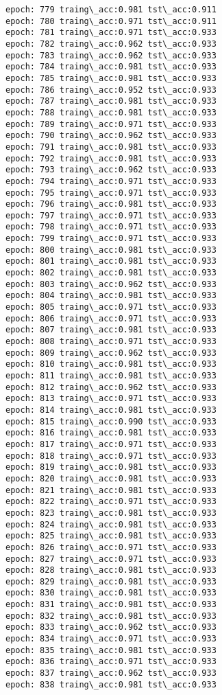\documentclass[11pt]{article}
\begin{document}
\begin{Verbatim}[commandchars=\\\{\}]
epoch: 779 traing\_acc:0.981 tst\_acc:0.911
epoch: 780 traing\_acc:0.971 tst\_acc:0.911
epoch: 781 traing\_acc:0.971 tst\_acc:0.933
epoch: 782 traing\_acc:0.962 tst\_acc:0.933
epoch: 783 traing\_acc:0.962 tst\_acc:0.933
epoch: 784 traing\_acc:0.981 tst\_acc:0.933
epoch: 785 traing\_acc:0.981 tst\_acc:0.933
epoch: 786 traing\_acc:0.952 tst\_acc:0.933
epoch: 787 traing\_acc:0.981 tst\_acc:0.933
epoch: 788 traing\_acc:0.981 tst\_acc:0.933
epoch: 789 traing\_acc:0.971 tst\_acc:0.933
epoch: 790 traing\_acc:0.962 tst\_acc:0.933
epoch: 791 traing\_acc:0.981 tst\_acc:0.933
epoch: 792 traing\_acc:0.981 tst\_acc:0.933
epoch: 793 traing\_acc:0.962 tst\_acc:0.933
epoch: 794 traing\_acc:0.971 tst\_acc:0.933
epoch: 795 traing\_acc:0.971 tst\_acc:0.933
epoch: 796 traing\_acc:0.981 tst\_acc:0.933
epoch: 797 traing\_acc:0.971 tst\_acc:0.933
epoch: 798 traing\_acc:0.971 tst\_acc:0.933
epoch: 799 traing\_acc:0.971 tst\_acc:0.933
epoch: 800 traing\_acc:0.981 tst\_acc:0.933
epoch: 801 traing\_acc:0.981 tst\_acc:0.933
epoch: 802 traing\_acc:0.981 tst\_acc:0.933
epoch: 803 traing\_acc:0.962 tst\_acc:0.933
epoch: 804 traing\_acc:0.981 tst\_acc:0.933
epoch: 805 traing\_acc:0.971 tst\_acc:0.933
epoch: 806 traing\_acc:0.971 tst\_acc:0.933
epoch: 807 traing\_acc:0.981 tst\_acc:0.933
epoch: 808 traing\_acc:0.971 tst\_acc:0.933
epoch: 809 traing\_acc:0.962 tst\_acc:0.933
epoch: 810 traing\_acc:0.981 tst\_acc:0.933
epoch: 811 traing\_acc:0.981 tst\_acc:0.933
epoch: 812 traing\_acc:0.962 tst\_acc:0.933
epoch: 813 traing\_acc:0.971 tst\_acc:0.933
epoch: 814 traing\_acc:0.981 tst\_acc:0.933
epoch: 815 traing\_acc:0.990 tst\_acc:0.933
epoch: 816 traing\_acc:0.981 tst\_acc:0.933
epoch: 817 traing\_acc:0.971 tst\_acc:0.933
epoch: 818 traing\_acc:0.971 tst\_acc:0.933
epoch: 819 traing\_acc:0.981 tst\_acc:0.933
epoch: 820 traing\_acc:0.981 tst\_acc:0.933
epoch: 821 traing\_acc:0.981 tst\_acc:0.933
epoch: 822 traing\_acc:0.971 tst\_acc:0.933
epoch: 823 traing\_acc:0.981 tst\_acc:0.933
epoch: 824 traing\_acc:0.981 tst\_acc:0.933
epoch: 825 traing\_acc:0.981 tst\_acc:0.933
epoch: 826 traing\_acc:0.971 tst\_acc:0.933
epoch: 827 traing\_acc:0.971 tst\_acc:0.933
epoch: 828 traing\_acc:0.981 tst\_acc:0.933
epoch: 829 traing\_acc:0.981 tst\_acc:0.933
epoch: 830 traing\_acc:0.981 tst\_acc:0.933
epoch: 831 traing\_acc:0.981 tst\_acc:0.933
epoch: 832 traing\_acc:0.981 tst\_acc:0.933
epoch: 833 traing\_acc:0.962 tst\_acc:0.933
epoch: 834 traing\_acc:0.971 tst\_acc:0.933
epoch: 835 traing\_acc:0.981 tst\_acc:0.933
epoch: 836 traing\_acc:0.971 tst\_acc:0.933
epoch: 837 traing\_acc:0.962 tst\_acc:0.933
epoch: 838 traing\_acc:0.981 tst\_acc:0.933

\end{Verbatim}
\end{document}
